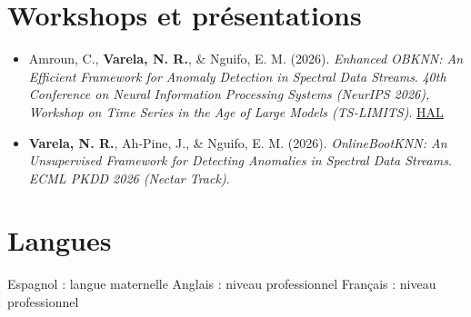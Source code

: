 \documentclass[12pt,a4paper]{article}
\begin{document}
\section*{Workshops et présentations}
\begin{itemize}
\item Amroun, C., \textbf{Varela, N. R.}, \& Nguifo, E. M. (2026). \textit{Enhanced OBKNN: An Efficient Framework for Anomaly Detection in Spectral Data Streams}. \textit{40th Conference on Neural Information Processing Systems (NeurIPS 2026), Workshop on Time Series in the Age of Large Models (TS-LIMITS)}. \href{https://hal.science/hal-05803665/}{HAL}
\item \textbf{Varela, N. R.}, Ah-Pine, J., \& Nguifo, E. M. (2026). \textit{OnlineBootKNN: An Unsupervised Framework for Detecting Anomalies in Spectral Data Streams}. \textit{ECML PKDD 2026 (Nectar Track)}.
\end{itemize}

\section*{Langues}
Espagnol : langue maternelle \textbar{} Anglais : niveau professionnel \textbar{} Français : niveau professionnel
\end{document}
